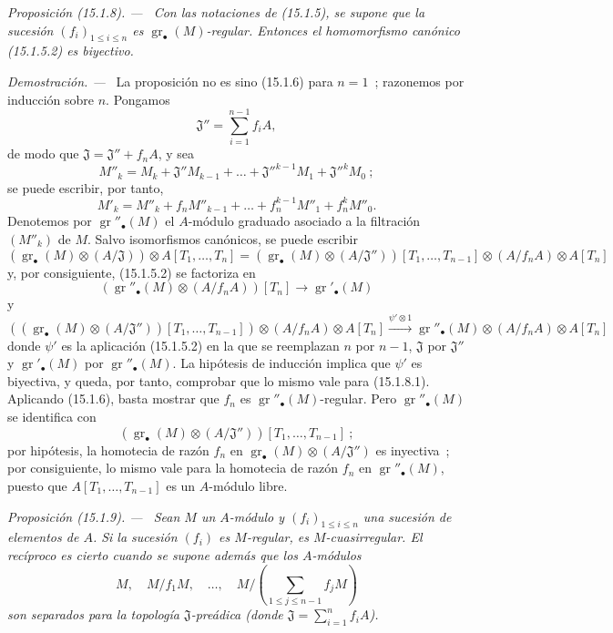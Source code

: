 \documentclass[10pt,oneside]{book}
\makeatletter
\newcommand{\gr}{\operatorname{gr}}
\newcommand{\setmanualcurrentlabel}[1]{\def\@currentlabel{#1}}
\newenvironment{proposition}[1][]{%
  \setmanualcurrentlabel{#1}\par\medskip\noindent\itshape Proposición (#1). ---\ }{\par}
\newenvironment{proof}{%
  \par\medskip\noindent\textit{Demostración. ---\ }}{\par}
\makeatother
\begin{document}
\begin{proposition}[15.1.8]
\label{0.15.1.8-es}
Con las notaciones de (15.1.5), se supone que la sucesión
$(f_i)_{1\leq i\leq n}$ es $\gr_\bullet(M)$-regular. Entonces
el homomorfismo canónico (15.1.5.2) es biyectivo.
\end{proposition}

\begin{proof}
La proposición no es sino (15.1.6) para $n=1$~; razonemos por inducción sobre
$n$. Pongamos
\[
  \mathfrak{J}''=\sum_{i=1}^{n-1}f_iA,
\]
de modo que $\mathfrak{J}=\mathfrak{J}''+f_nA$, y sea
\[
  M''_k=M_k+\mathfrak{J}''M_{k-1}+\ldots+
  \mathfrak{J}''^{k-1}M_1+\mathfrak{J}''^kM_0~;
\]
se puede escribir, por tanto,
\[
  M'_k=M''_k+f_nM''_{k-1}+\ldots+f_n^{k-1}M''_1+f_n^kM''_0.
\]
Denotemos por $\gr''_\bullet(M)$ el $A$-módulo graduado asociado a la filtración
$(M''_k)$ de $M$. Salvo isomorfismos canónicos, se puede escribir
\[
  (\gr_\bullet(M)\otimes(A/\mathfrak{J}))\otimes A[T_1,\ldots,T_n]
  =
  (\gr_\bullet(M)\otimes(A/\mathfrak{J}''))[T_1,\ldots,T_{n-1}]
  \otimes(A/f_nA)\otimes A[T_n]
\]
y, por consiguiente, (15.1.5.2) se factoriza en
\[
  (\gr''_\bullet(M)\otimes(A/f_nA))[T_n]\longrightarrow\gr'_\bullet(M)
  \tag{15.1.8.1}\label{0.15.1.8.1-es}
\]
y
\[
  ((\gr_\bullet(M)\otimes(A/\mathfrak{J}''))[T_1,\ldots,T_{n-1}])
  \otimes(A/f_nA)\otimes A[T_n]
  \xrightarrow{\psi'\otimes1}
  \gr''_\bullet(M)\otimes(A/f_nA)\otimes A[T_n]
\]
donde $\psi'$ es la aplicación (15.1.5.2) en la que se reemplazan $n$ por
$n-1$, $\mathfrak{J}$ por $\mathfrak{J}''$ y $\gr'_\bullet(M)$ por
$\gr''_\bullet(M)$. La hipótesis de inducción implica que $\psi'$ es
biyectiva, y queda, por tanto, comprobar que lo mismo vale para (15.1.8.1).
Aplicando (15.1.6), basta mostrar que $f_n$ es
$\gr''_\bullet(M)$-regular. Pero $\gr''_\bullet(M)$ se identifica con
\[
  (\gr_\bullet(M)\otimes(A/\mathfrak{J}''))
  [T_1,\ldots,T_{n-1}]~;
\]
por hipótesis, la homotecia de razón $f_n$ en
$\gr_\bullet(M)\otimes(A/\mathfrak{J}'')$ es inyectiva~; por consiguiente, lo
mismo vale para la homotecia de razón $f_n$ en $\gr''_\bullet(M)$, puesto que
$A[T_1,\ldots,T_{n-1}]$ es un $A$-módulo libre.
\end{proof}
\begin{proposition}[15.1.9]
\label{0.15.1.9-es}
Sean $M$ un $A$-módulo y $(f_i)_{1\leq i\leq n}$ una sucesión de elementos de
$A$. Si la sucesión $(f_i)$ es $M$-regular, es $M$-cuasirregular. El recíproco
es cierto cuando se supone además que los $A$-módulos
\[
  M,\quad M/f_1M,\quad\ldots,\quad
  M/\left(\sum_{1\leq j\leq n-1}f_jM\right)
\]
son separados para la topología $\mathfrak{J}$-preádica (donde
$\mathfrak{J}=\sum_{i=1}^n f_iA$).
\end{proposition}
\end{document}
